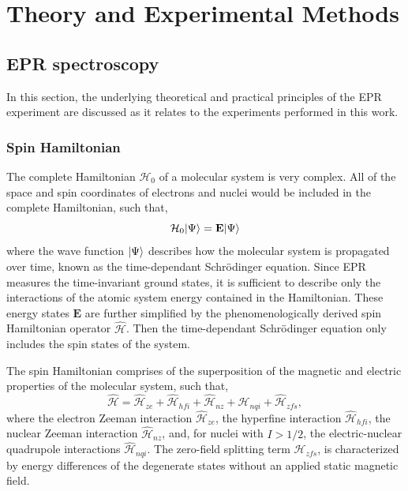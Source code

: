 \chapter[Theory and Experimental Methods]{Theory and Experimental Methods}
\section{EPR spectroscopy}

In this section, the underlying theoretical and practical principles of the EPR experiment are discussed as it relates to the experiments performed in this work. 

\subsection{Spin Hamiltonian}
The complete Hamiltonian $\mathcal{H}_0$ of a molecular system is very complex. All of the space and spin coordinates of electrons and nuclei would be included in the complete Hamiltonian, such that,
\begin{equation}
    \mathcal{H}_0 \lvert\Psi\rangle = {\mathbf E} \lvert\Psi\rangle
\end{equation}
where the wave function $\lvert\Psi\rangle$ describes how the molecular system is propagated over time, known as the time-dependant Schr\"{o}dinger equation. Since EPR measures the time-invariant ground states, it is sufficient to describe only the interactions of the atomic system energy contained in the Hamiltonian. These energy states ${\mathbf E}$ are further simplified by the phenomenologically derived spin Hamiltonian operator $\hat{\mathcal{H}}$. Then the time-dependant Schr\"{o}dinger equation only includes the spin states of the system. \cite{SpinDyn,abragam1961} 

The spin Hamiltonian comprises of the superposition of the magnetic and electric properties of the molecular system, such that,
\begin{equation}
    \hat{\mathcal{H}} = \hat{\mathcal{H}}_{ze} + \hat{\mathcal{H}}_{hfi} + \hat{\mathcal{H}}_{nz} + \hat{\mathcal{H}}_{nqi} + \hat{\mathcal{H}}_{zfs},
\end{equation}
where the electron Zeeman interaction $\hat{\mathcal{H}}_{ze}$, the hyperfine interaction $\hat{\mathcal{H}}_{hfi}$, the nuclear Zeeman interaction $\hat{\mathcal{H}}_{nz}$, and, for nuclei with $I > 1/2$, the electric-nuclear quadrupole interactions $\hat{\mathcal{H}}_{nqi}$. The zero-field splitting term $ \hat{\mathcal{H}}_{zfs}$, is characterized by energy differences of the degenerate states without an applied static magnetic field. 


